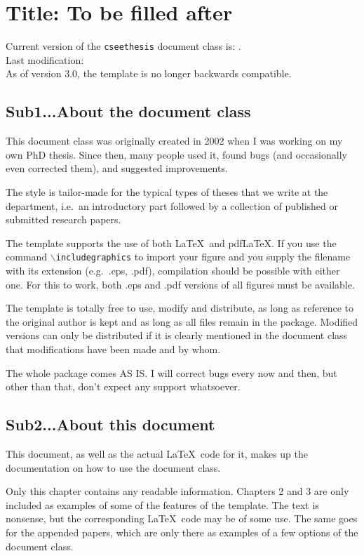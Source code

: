 \section{Title: To be filled after}
Current version of the \texttt{cseethesis} document class is: \classversion.\\
Last modification: \classdate\\

\noindent As of version 3.0, the template is no longer backwards compatible.

\subsection{Sub1...About the document class}
This document class was originally created in 2002 when I was working on my own PhD thesis. Since then, many people used it, found bugs (and occasionally even corrected them), and suggested improvements.

The style is tailor-made for the typical types of theses that we write at the department, i.e.\ an introductory part followed by a collection of published or submitted research papers. 

The template supports the use of both \LaTeX\ and pdfLaTeX. If you use the command \texttt{$\backslash$includegraphics} to import your figure and you supply the filename with its extension (e.g.\ .eps, .pdf), compilation should be possible with either one. For this to work, both .eps and .pdf versions of all figures must be available.

The template is totally free to use, modify and distribute, as long as reference to the original author is kept and as long as all files remain in the package. Modified versions can only be distributed if it is clearly mentioned in the document class that modifications have been made and by whom.

The whole package comes AS IS. I will correct bugs every now and then, but other than that, don't expect any support whatsoever.


\subsection{Sub2...About this document}
This document, as well as the actual \LaTeX\ code for it, makes up the documentation on how to use the document class.

Only this chapter contains any readable information. Chapters 2 and 3 are only included as examples of some of the features of the template. The text is nonsense, but the corresponding \LaTeX\ code may be of some use. The same goes for the appended papers, which are only there as examples of a few options of the document class.

